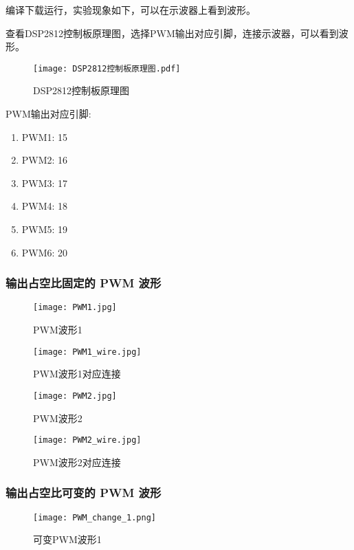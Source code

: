 \documentclass{math201}
\begin{document}
编译下载运行，实验现象如下，可以在示波器上看到波形。

查看DSP2812控制板原理图，选择PWM输出对应引脚，连接示波器，可以看到波形。

\begin{figure}[H]
  \centering\texttt{[image: DSP2812控制板原理图.pdf]}
  \caption{DSP2812控制板原理图}      
\end{figure}

PWM输出对应引脚:

\begin{enumerate}
  \item PWM1: 15
  \item PWM2: 16
  \item PWM3: 17
  \item PWM4: 18
  \item PWM5: 19
  \item PWM6: 20
\end{enumerate}

\subsubsection{输出占空比固定的 PWM 波形}

\begin{figure}[H]  
  \centering\texttt{[image: PWM1.jpg]}  
  \caption{PWM波形1}      
\end{figure}

\begin{figure}[H]  
  \centering\texttt{[image: PWM1\_wire.jpg]}  
  \caption{PWM波形1对应连接}      
\end{figure}

\begin{figure}[H]  
  \centering\texttt{[image: PWM2.jpg]}  
  \caption{PWM波形2}      
\end{figure}

\begin{figure}[H]  
  \centering\texttt{[image: PWM2\_wire.jpg]}  
  \caption{PWM波形2对应连接}      
\end{figure}

\subsubsection{输出占空比可变的 PWM 波形}

\begin{figure}[H]  
  \centering\texttt{[image: PWM\_change\_1.png]}  
  \caption{可变PWM波形1}      
\end{figure}
\end{document}
